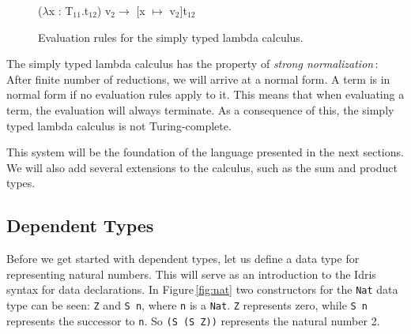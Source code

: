 \begin{center}
\begin{figure}

\begin{prooftree}
\end{prooftree}

\begin{prooftree}
\end{prooftree}

\begin{center}
($\lambda$x : T$_{11}$.t$_{12}$) v$_{2} \longrightarrow$ [x $\mapsto$ v$_{2}$]t$_{12}$ 
\end{center}

\caption{Evaluation rules for the simply typed lambda calculus.}
\label{fig:simple-evaluation-rules}

\end{figure}
\end{center}

The simply typed lambda calculus has the property of \emph{strong normalization}\,\cite[pp. 149]{Pierce:TypeSystems}: After finite number of reductions, we will arrive at a normal form. A term is in normal form if no evaluation rules apply to it. This means that when evaluating a term, the evaluation will always terminate. As a consequence of this, the simply typed lambda calculus is not Turing-complete.

This system will be the foundation of the language presented in the next sections. We will also add several extensions to the calculus, such as the sum and product types.

\subsection{Dependent Types}
\label{sec:dependent-types-idris}
Before we get started with dependent types, let us define a data type for representing natural numbers. This will serve as an introduction to the Idris syntax for data declarations. In Figure\,\ref{fig:nat} two constructors for the \texttt{Nat} data type can be seen: \texttt{Z} and \texttt{S n}, where \texttt{n} is a \texttt{Nat}. \texttt{Z} represents zero, while \texttt{S n} represents the successor to \texttt{n}. So \texttt{(S (S Z))} represents the natural number 2.

